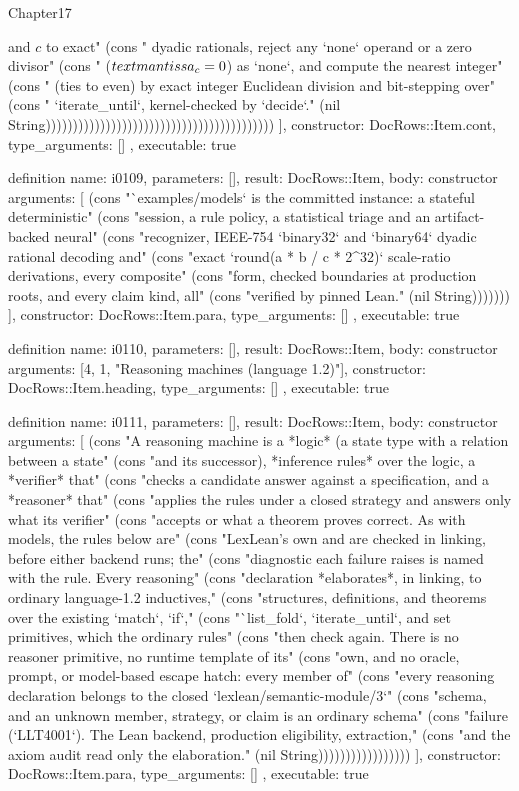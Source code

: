 \begin{lexlean}{Chapter17}
\begin{semanticmodule}
{{and $c$ to exact" (cons "      dyadic rationals, reject any `none` operand or a zero divisor" (cons "      ($\\text{mantissa}_c = 0$) as `none`, and compute the nearest integer" (cons "      (ties to even) by exact integer Euclidean division and bit-stepping over" (cons "      `iterate_until`, kernel-checked by `decide`." (nil String))))))))))))))))))))))))))))))))))))))))))
    ],
    constructor: DocRows::Item.cont,
    type_arguments: []
  },
  executable: true
}

definition{
  name: i0109,
  parameters: [],
  result: DocRows::Item,
  body: constructor{
    arguments: [
      (cons "`examples/models` is the committed instance: a stateful deterministic" (cons "session, a rule policy, a statistical triage and an artifact-backed neural" (cons "recognizer, IEEE-754 `binary32` and `binary64` dyadic rational decoding and" (cons "exact `round(a * b / c * 2^32)` scale-ratio derivations, every composite" (cons "form, checked boundaries at production roots, and every claim kind, all" (cons "verified by pinned Lean." (nil String)))))))
    ],
    constructor: DocRows::Item.para,
    type_arguments: []
  },
  executable: true
}

definition{
  name: i0110,
  parameters: [],
  result: DocRows::Item,
  body: constructor{
    arguments: [4, 1, "Reasoning machines (language 1.2)"],
    constructor: DocRows::Item.heading,
    type_arguments: []
  },
  executable: true
}

definition{
  name: i0111,
  parameters: [],
  result: DocRows::Item,
  body: constructor{
    arguments: [
      (cons "A reasoning machine is a *logic* (a state type with a relation between a state" (cons "and its successor), *inference rules* over the logic, a *verifier* that" (cons "checks a candidate answer against a specification, and a *reasoner* that" (cons "applies the rules under a closed strategy and answers only what its verifier" (cons "accepts or what a theorem proves correct. As with models, the rules below are" (cons "LexLean's own and are checked in linking, before either backend runs; the" (cons "diagnostic each failure raises is named with the rule. Every reasoning" (cons "declaration *elaborates*, in linking, to ordinary language-1.2 inductives," (cons "structures, definitions, and theorems over the existing `match`, `if`," (cons "`list_fold`, `iterate_until`, and set primitives, which the ordinary rules" (cons "then check again. There is no reasoner primitive, no runtime template of its" (cons "own, and no oracle, prompt, or model-based escape hatch: every member of" (cons "every reasoning declaration belongs to the closed `lexlean/semantic-module/3`" (cons "schema, and an unknown member, strategy, or claim is an ordinary schema" (cons "failure (`LLT4001`). The Lean backend, production eligibility, extraction," (cons "and the axiom audit read only the elaboration." (nil String)))))))))))))))))
    ],
    constructor: DocRows::Item.para,
    type_arguments: []
  },
  executable: true
}


\end{semanticmodule}
\end{lexlean}
